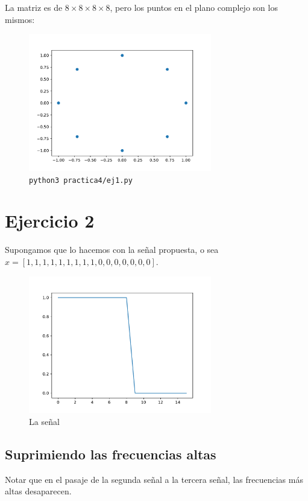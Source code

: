 \documentclass[11pt, spanish]{article}
\begin{document}
La matriz es de $8\times 8\times 8\times 8$, pero los puntos en el plano complejo son los mismos:

\begin{figure}[H]
\centering
  \includegraphics[height=6cm]{informe-imgs/ej1.pdf}
  \caption{\texttt{python3 practica4/ej1.py}}
\end{figure}

\newpage
\section{Ejercicio 2}
Supongamos que lo hacemos con la señal propuesta, o sea $x = [1, 1, 1, 1, 1, 1, 1, 1, 1, 0, 0, 0, 0, 0, 0, 0]$.

\begin{figure}[H]
\centering
  \includegraphics[height=6cm]{informe-imgs/ej2-senial.pdf}
  \caption{La señal}
\end{figure}

\subsection{Suprimiendo las frecuencias altas}

Notar que en el pasaje de la segunda señal a la tercera señal, las frecuencias más altas desaparecen.
\end{document}
